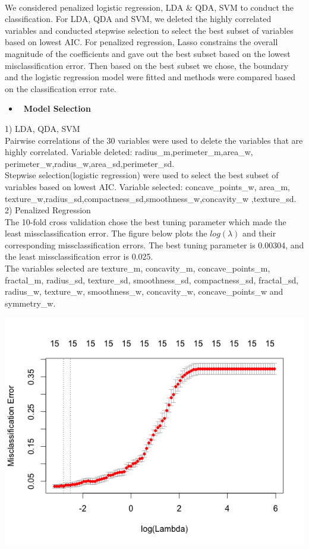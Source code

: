 \documentclass[11pt]{article}
\begin{document}
 \vspace{2ex}\\
We considered penalized logistic regression, LDA \& QDA, SVM to conduct the classification. For LDA, QDA and SVM, we deleted the highly correlated variables and conducted stepwise selection to select the best subset of variables based on lowest AIC. For penalized regression, Lasso constrains the overall magnitude of the coefficients and gave out the best subset based on the lowest misclassification error. Then based on the best subset we chose, the boundary and the logistic regression model were fitted and methods were compared based on the classification error rate.
\begin{itemize}
\item {\bf\ Model Selection }
\end{itemize}
1) LDA, QDA, SVM\\
Pairwise correlations of the 30 variables were used to delete the variables that are highly correlated. Variable deleted: radius\_m,perimeter\_m,area\_w,
perimeter\_w,radius\_w,area\_sd,perimeter\_sd. \vspace{2ex}\\
Stepwise selection(logistic regression) were used to select the best subset of variables based on lowest AIC. Variable selected: concave\_points\_w, area\_m, texture\_w,radius\_sd,compactness\_sd,smoothness\_w,concavity\_w ,texture\_sd.\vspace{2ex}\\
2) Penalized Regression\\
The 10-fold cross validation chose the best tuning parameter which made the least missclassification error. The figure below plots the $log(\lambda)$ and their corresponding missclassification errors. The best tuning parameter is 0.00304, and the least missclassification error is 0.025.  \vspace{2ex}\\
The variables selected are texture\_m, concavity\_m, concave\_points\_m, fractal\_m, radius\_sd, texture\_sd, smoothness\_sd, compactness\_sd, fractal\_sd, radius\_w, texture\_w, smoothness\_w, concavity\_w, concave\_points\_w and symmetry\_w.
\begin{center}
\includegraphics[width=1.0\linewidth]{Rplot}
\end{center}
\end{document}
